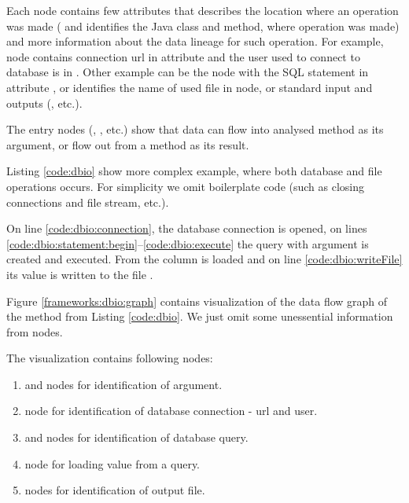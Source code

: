 Each node contains few attributes that describes the location where an operation was made
( and  identifies the Java class and method, where operation was made)
and more information about the data lineage for such operation.
For example,  node contains connection url in 
attribute and the user used to connect to database is in .
Other example can be the  node with the SQL statement in attribute ,
or  identifies the name of used file in  node,
or standard input and outputs (, etc.).

The entry nodes (, , etc.) show that data can flow
into analysed method as its argument, or flow out from a method as its result.

Listing \ref{code:dbio} show more complex example, where both database and file
operations occurs. For simplicity we omit boilerplate code (such as closing connections and file stream, etc.).

On line \ref{code:dbio:connection}, the database connection is opened,
on lines \ref{code:dbio:statement:begin}--\ref{code:dbio:execute} the query
with  argument is created and executed. From  the 
column is loaded and on line \ref{code:dbio:writeFile} its value is written to the file .


Figure \ref{frameworks:dbio:graph} contains visualization of the data flow graph
of the  method from Listing \ref{code:dbio}.
We just omit some unessential information from nodes.

The visualization contains following nodes:
\begin{enumerate}
  \item {} and  nodes for identification of  argument.
  \item {} node for identification of database connection - url and user.
  \item {} and  nodes for identification of database query.
  \item {} node for loading value from a query.
  \item {} nodes for identification of output file.
\end{enumerate}

